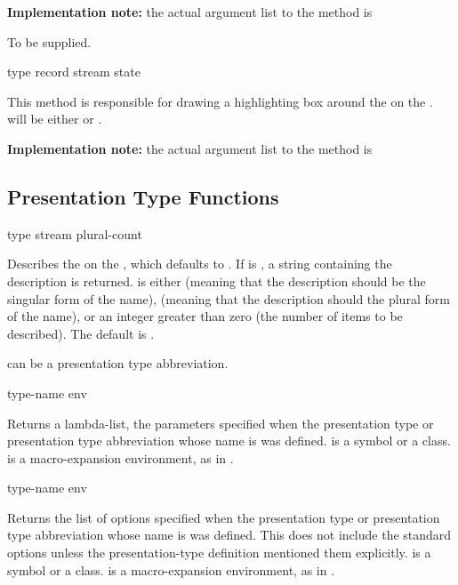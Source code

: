 {\bf Implementation note:} the actual argument list to the
 method is
\\


 {}

 {To be supplied.}


 {type record stream state}

This method is responsible for drawing a highlighting box around the
  on the 
.   will be either  or .

{\bf Implementation note:} the actual argument list to the
 method is
\\



\subsection {Presentation Type Functions}

 {type \optional stream plural-count}

Describes the   on the 
, which defaults to .  If  is
, a string containing the description is returned.  
is either  (meaning that the description should be the singular form of
the name),  (meaning that the description should the plural form of the
name), or an integer greater than zero (the number of items to be described).
The default is .

 can be a presentation type abbreviation.


 {type-name \optional env}

Returns a lambda-list, the parameters specified when the presentation type or
presentation type abbreviation whose name is  was defined.
 is a symbol or a class.   is a macro-expansion
environment, as in .


 {type-name \optional env}

Returns the list of options specified when the presentation type or presentation
type abbreviation whose name is  was defined.  This does not
include the standard options unless the presentation-type definition mentioned
them explicitly.   is a symbol or a class.   is a
macro-expansion environment, as in .


